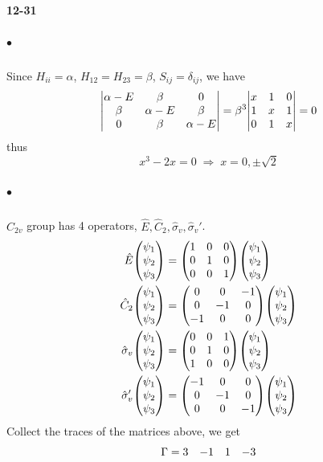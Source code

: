 \documentclass[a4paper]{article}
\DeclareMathOperator{\dra}{\Rightarrow}
\newcommand{\ex}[1]{\paragraph{12-#1}}
\newcommand{\subex}[1]{\subparagraph{#1}}
\numberwithin{equation}{section}
\begin{document}
\ex{31}
\subex{$ \bullet $}
Since $ H_{ii} = \alpha $, $ H_{12} = H_{23} = \beta $, $ S_{ij} = \delta_{ij} $, we have
\begin{equation}\label{key}
\mqty|\alpha - E & \beta & 0 \\ \beta & \alpha-E & \beta\\ 0 & \beta & \alpha-E| = \beta^3\mqty|x & 1 & 0\\ 1 & x& 1\\ 0 & 1 & x| = 0
\end{equation}
thus
\begin{equation}\label{key}
x^3 - 2x = 0 \;\dra\; x= 0, \pm\sqrt{2}
\end{equation}
\subex{$ \bullet $}
$ C_{2v} $ group has 4 operators, $ \hat{E}, \hat{C}_2, \hat\sigma_v, \hat\sigma_v' $.
\begin{align}
\hat{E}\mqty(\psi_1\\\psi_2\\\psi_3) &= \mqty(1 & 0 & 0\\ 0 & 1 & 0\\ 0 & 0 & 1) \mqty(\psi_1\\\psi_2\\\psi_3) \\
\hat{C}_2\mqty(\psi_1\\\psi_2\\\psi_3) &= \mqty(0 & 0 & -1\\ 0 & -1 & 0\\ -1 & 0 & 0) \mqty(\psi_1\\\psi_2\\\psi_3) \\
\hat\sigma_v\mqty(\psi_1\\\psi_2\\\psi_3) &= \mqty(0 & 0 & 1\\ 0 & 1 & 0\\ 1 & 0 & 0) \mqty(\psi_1\\\psi_2\\\psi_3) \\
\hat\sigma_v'\mqty(\psi_1\\\psi_2\\\psi_3) &= \mqty(-1 & 0 & 0\\ 0 & -1 & 0\\ 0 & 0 & -1) \mqty(\psi_1\\\psi_2\\\psi_3) 
\end{align}
Collect the traces of the matrices above, we get
\begin{equation}\label{key}
 \Gamma = \mqty{3 & -1 & 1 & -3} 
\end{equation}
\end{document}
